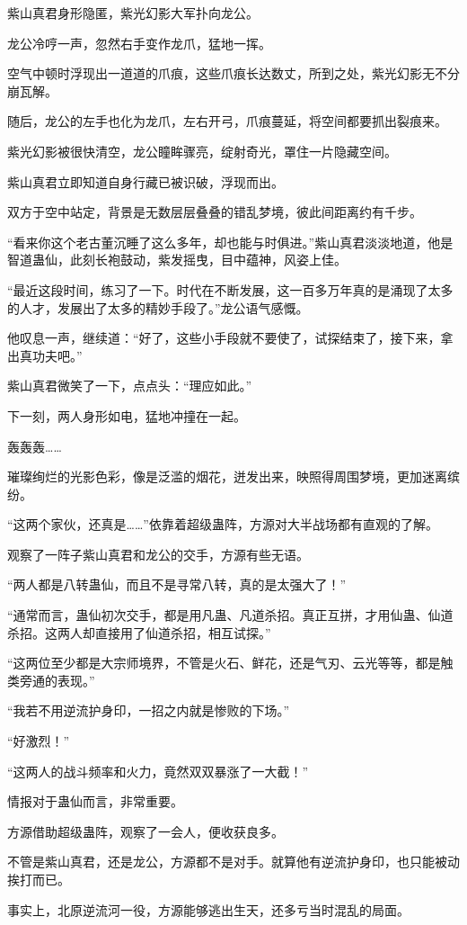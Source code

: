 \begin{this_body}
紫山真君身形隐匿，紫光幻影大军扑向龙公。

龙公冷哼一声，忽然右手变作龙爪，猛地一挥。

空气中顿时浮现出一道道的爪痕，这些爪痕长达数丈，所到之处，紫光幻影无不分崩瓦解。

随后，龙公的左手也化为龙爪，左右开弓，爪痕蔓延，将空间都要抓出裂痕来。

紫光幻影被很快清空，龙公瞳眸骤亮，绽射奇光，罩住一片隐藏空间。

紫山真君立即知道自身行藏已被识破，浮现而出。

双方于空中站定，背景是无数层层叠叠的错乱梦境，彼此间距离约有千步。

“看来你这个老古董沉睡了这么多年，却也能与时俱进。”紫山真君淡淡地道，他是智道蛊仙，此刻长袍鼓动，紫发摇曳，目中蕴神，风姿上佳。

“最近这段时间，练习了一下。时代在不断发展，这一百多万年真的是涌现了太多的人才，发展出了太多的精妙手段了。”龙公语气感慨。

他叹息一声，继续道：“好了，这些小手段就不要使了，试探结束了，接下来，拿出真功夫吧。”

紫山真君微笑了一下，点点头：“理应如此。”

下一刻，两人身形如电，猛地冲撞在一起。

轰轰轰……

璀璨绚烂的光影色彩，像是泛滥的烟花，迸发出来，映照得周围梦境，更加迷离缤纷。

“这两个家伙，还真是……”依靠着超级蛊阵，方源对大半战场都有直观的了解。

观察了一阵子紫山真君和龙公的交手，方源有些无语。

“两人都是八转蛊仙，而且不是寻常八转，真的是太强大了！”

“通常而言，蛊仙初次交手，都是用凡蛊、凡道杀招。真正互拼，才用仙蛊、仙道杀招。这两人却直接用了仙道杀招，相互试探。”

“这两位至少都是大宗师境界，不管是火石、鲜花，还是气刃、云光等等，都是触类旁通的表现。”

“我若不用逆流护身印，一招之内就是惨败的下场。”

“好激烈！”

“这两人的战斗频率和火力，竟然双双暴涨了一大截！”

情报对于蛊仙而言，非常重要。

方源借助超级蛊阵，观察了一会人，便收获良多。

不管是紫山真君，还是龙公，方源都不是对手。就算他有逆流护身印，也只能被动挨打而已。

事实上，北原逆流河一役，方源能够逃出生天，还多亏当时混乱的局面。


\end{this_body}
